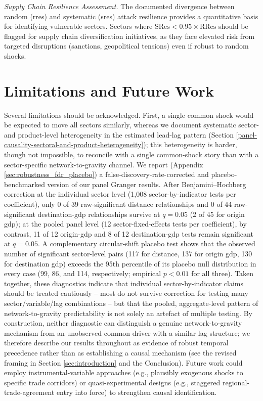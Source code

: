 \documentclass[preprint, 3p,
authoryear]{elsarticle} %
\begin{document}
\textit{Supply Chain Resilience Assessment.} The documented divergence
between random (\gls{rres}) and systematic (\gls{sres}) attack
resilience provides a quantitative basis for identifying vulnerable
sectors. Sectors where \(\text{SRes} < 0.95 \times \text{RRes}\) should
be flagged for supply chain diversification initiatives, as they face
elevated risk from targeted disruptions (sanctions, geopolitical
tensions) even if robust to random shocks.

\section{Limitations and Future Work}\label{sec:limitations}

Several limitations should be acknowledged. First, a single common shock
would be expected to move all sectors similarly, whereas we document
systematic sector- and product-level heterogeneity in the estimated
lead-lag pattern (Section
\ref{panel-causality-sectoral-and-product-heterogeneity}); this
heterogeneity is harder, though not impossible, to reconcile with a
single common-shock story than with a sector-specific network-to-gravity
channel. We report (Appendix \ref{sec:robustness_fdr_placebo}) a
false-discovery-rate-corrected and placebo-benchmarked version of our
panel Granger results. After Benjamini--Hochberg correction
\citep{benjaminihochberg1995} at the individual sector level (1,008
sector-by-indicator tests per coefficient), only 0 of 39 raw-significant
distance relationships and 0 of 44 raw-significant destination-\gls{gdp}
relationships survive at \(q=0.05\) (2 of 45 for origin \gls{gdp}); at
the pooled panel level (12 sector-fixed-effects tests per coefficient),
by contrast, 11 of 12 origin-\gls{gdp} and 8 of 12 destination-\gls{gdp}
tests remain significant at \(q=0.05\). A complementary circular-shift
placebo test \citep{theiler1992surrogate} shows that the observed number
of significant sector-level pairs (117 for distance, 137 for origin
\gls{gdp}, 130 for destination \gls{gdp}) exceeds the 95th percentile of
its placebo null distribution in every case (99, 86, and 114,
respectively; empirical \(p<0.01\) for all three). Taken together, these
diagnostics indicate that individual sector-by-indicator claims should
be treated cautiously -- most do not survive correction for testing many
sector/variable/lag combinations -- but that the pooled, aggregate-level
pattern of network-to-gravity predictability is not solely an artefact
of multiple testing. By construction, neither diagnostic can distinguish
a genuine network-to-gravity mechanism from an unobserved common driver
with a similar lag structure; we therefore describe our results
throughout as evidence of robust temporal precedence rather than as
establishing a causal mechanism (see the revised framing in Section
\ref{sec:introduction} and the Conclusion). Future work could employ
instrumental-variable approaches (e.g., plausibly exogenous shocks to
specific trade corridors) or quasi-experimental designs (e.g., staggered
regional-trade-agreement entry into force) to strengthen causal
identification.
\end{document}
